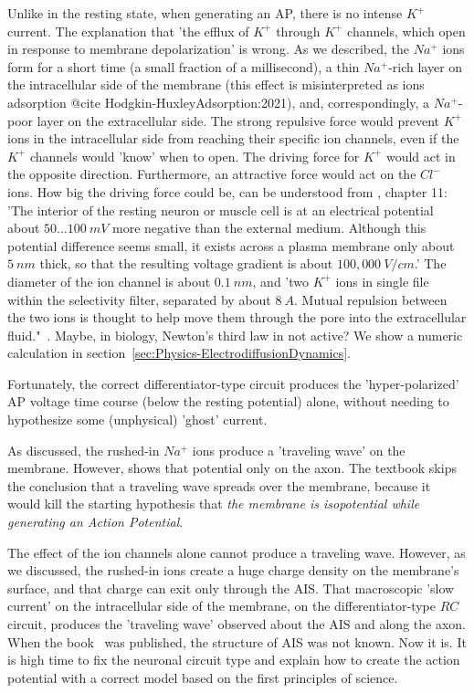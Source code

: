 Unlike in the resting state, when generating an 
AP, there is no intense $K^+$ current. The explanation that
'the efflux of $K^+$ through $K^+$ channels,
which open in response to membrane depolarization' \cite{MolecularBiology:2002}
is wrong. As we described, the $Na^+$ ions form for a
short time (a small fraction of a millisecond), a thin $Na^+$-rich layer on the
intracellular side of the membrane (this effect is misinterpreted
as ions adsorption @cite Hodgkin-HuxleyAdsorption:2021), 
and, correspondingly, a $Na^+$-poor layer on the extracellular side.
The strong repulsive force would prevent
$K^+$ ions in the intracellular side from reaching their specific ion channels,
even if the $K^+$ channels would 'know' when to open.
The driving force for $K^+$ would act in the opposite direction.
Furthermore, an attractive force would act on the $Cl^-$ ions.
How big the driving force could be, can be understood from \cite{MolecularBiology:2002}, chapter 11:
'The interior of the resting neuron or muscle cell is at an electrical potential
about $50\dots 100\ mV$ more negative than the external medium.
Although this potential difference seems small, it exists across a plasma membrane
only about $5\ nm$ thick, so that the resulting voltage gradient is about $100,000\ V/cm$.'
The diameter of the ion channel is about $0.1\ nm$, and
'two $K^+$ ions in single file within the selectivity filter,
separated by about $8\ A$.
Mutual repulsion between the two ions is thought to help move them through the pore
into the extracellular fluid."~\cite{MolecularBiology:2002}. Maybe, in biology, Newton's third law in not active?
We show a numeric calculation in section~\ref{sec:Physics-ElectrodiffusionDynamics}.

Fortunately, the correct differentiator-type
circuit produces the 'hyper-polarized' 
AP voltage time course
(below the resting potential) alone, without needing to hypothesize
some (unphysical) 'ghost' current.

As discussed,
the rushed-in $Na^+$ ions
produce a 'traveling wave' on the membrane. However,  \cite{MolecularBiology:2002} shows that potential only on the axon.
The textbook skips the conclusion that a traveling wave spreads over the membrane,
because it would kill the starting hypothesis that
\textit{the membrane is isopotential while generating an Action Potential}.

The effect of the ion channels alone
cannot produce a traveling wave. However, as we discussed, the rushed-in ions
create a huge charge density on the membrane's surface, and that charge can exit only
through the 
AIS. That macroscopic 'slow current' on the intracellular side of the membrane,
on the differentiator-type $RC$ circuit, produces the 'traveling wave'
observed about the
AIS and along the axon.
When the book~\cite{MolecularBiology:2002} was published, the structure of 
AIS  \cite{AxonInitialSegmentStructure:2018} was not known.
Now it is. 
It is high time to fix the neuronal circuit type and explain how to create the action potential with a correct model based on the first principles of science.

